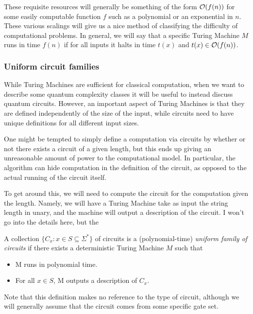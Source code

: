 \documentclass[../thesis-main/thesis-main]{subfiles}
\begin{document}
These requisite resources will generally be something of the form $\mathcal{O}(f(n))$ for some easily computable function $f$ such as a polynomial or an exponential in $n$.  These various scalings will give us a nice method of classifying the difficulty of computational problems.  In general, we will say that a specific Turing Machine $M$ runs in time $f(n)$ if for all inputs it halts in time $t(x)$ and $t(x) \in \mathcal{O}(f(n))$.

\subsubsection{Uniform circuit families}

While Turing Machines are sufficient for classical computation, when we want to describe some quantum complexity classes it will be useful to instead discuss quantum circuits.  However, an important aspect of Turing Machines is that they are defined independently of the size of the input, while circuits need to have unique definitions for all different input sizes.

One might be tempted to simply define a computation via circuits by whether or not there exists a circuit of a given length, but this ends up giving an unreasonable amount of power to the computational model.  In particular, the algorithm can hide computation in the definition of the circuit, as opposed to the actual running of the circuit itself.  

To get around this, we will need to compute the circuit for the computation given the length.  Namely, we will have a Turing Machine take as input the string length in unary, and the machine will output a description of the circuit.  I won't go into the details here, but the 

\begin{definition} A collection $\{C_x: x\in S\subseteq \Sigma^*\}$ of circuits is a (polynomial-time) \emph{uniform family of circuits} if there exists a deterministic Turing Machine $M$ such that 
\begin{itemize}
  \item M runs in polynomial time.
  \item For all $x\in S$, M outputs a description of $C_x$.
\end{itemize}
\end{definition}

Note that this definition makes no reference to the type of circuit, although we will generally assume that the circuit comes from some specific gate set.
\end{document}
